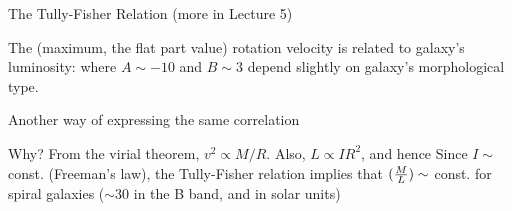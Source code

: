 \documentclass[letterpaper,landscape]{slides}
\begin{document}










\begin{slide}
\begin{center}
{\large \color{red} 
           The Tully-Fisher Relation (more in Lecture 5)}
\end{center}

The (maximum, the flat part value) rotation velocity is related to  
galaxy's luminosity: 
where $A\sim-10$ and $B\sim3$ depend slightly on galaxy's
morphological type.

Another way of expressing the same correlation

{\color{red} Why?} From the virial theorem, $v^2 \propto M/R$.
Also, $L \propto I R^2$, and hence
Since $I\sim$const. (Freeman's law), the Tully-Fisher relation implies
that $({M \over L}) \sim$ const. for spiral galaxies ($\sim$30 in the B 
band, and in solar units) 

\vfill
\end{slide}
\end{document}
